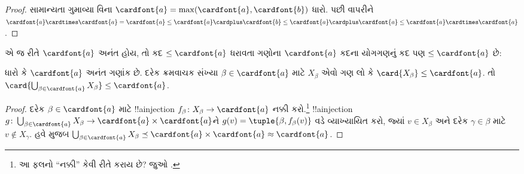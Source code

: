 \documentclass[../../../include/open-logic-section]{subfiles}
\begin{document}
\begin{proof}
સામાન્યતા ગુમાવ્યા વિના
$\cardfont{a} = \max(\cardfont{a},
\cardfont{b})$ ધારો. પછી 
વાપરીને
$\cardfont{a}\cardtimes\cardfont{a} = \cardfont{a} \leq \cardfont{a}
\cardplus \cardfont{b} \leq \cardfont{a} \cardplus \cardfont{a} \leq
\cardfont{a} \cardtimes \cardfont{a}$.
\end{proof}\noindent એ જ રીતે
$\cardfont{a}$ અનંત હોય, તો કદ
$\leq\cardfont{a}$ ધરાવતા ગણોના $\cardfont{a}$
કદના યોગગણનું કદ પણ $\leq\cardfont{a}$ છે:

\begin{prop}
ધારો કે $\cardfont{a}$ અનંત ગણાંક છે. દરેક
ક્રમવાચક સંખ્યા $\beta \in \cardfont{a}$ માટે
$X_\beta$ એવો ગણ લો કે
$\card{X_\beta} \leq \cardfont{a}$. તો
$\card{\bigcup_{\beta \in \cardfont{a}} X_\beta}
\leq \cardfont{a}$.
\end{prop}

\begin{proof}
દરેક $\beta \in \cardfont{a}$ માટે
!!a{injection} $f_\beta \colon X_\beta \to
\cardfont{a}$ નક્કી કરો.\footnote{આ ફલનો
``નક્કી'' કેવી રીતે કરાય છે? જુઓ
.}
!!a{injection} $g \colon \bigcup_{\beta \in
\cardfont{a}} X_\beta \to \cardfont{a} \times
\cardfont{a}$ને $g(v) = \tuple{\beta, f_\beta(v)}$
વડે વ્યાખ્યાયિત કરો, જ્યાં $v \in X_\beta$
અને દરેક $\gamma \in \beta$ માટે
$v \notin X_\gamma$. હવે
 મુજબ
$\bigcup_{\beta \in \cardfont{a}} X_\beta \preceq
\cardfont{a} \times \cardfont{a} \approx \cardfont{a}$.
\end{proof}
\end{document}
